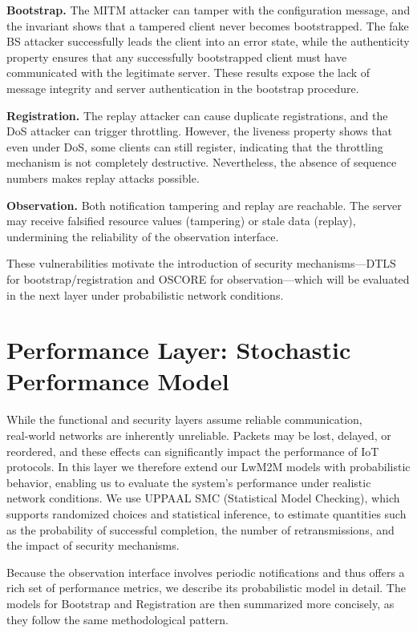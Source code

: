 \documentclass[a4paper,fleqn]{cas-sc}
\begin{document}
\textbf{Bootstrap.} The MITM attacker can tamper with the configuration message, and the invariant shows that a tampered client never becomes bootstrapped. The fake BS attacker successfully leads the client into an error state, while the authenticity property ensures that any successfully bootstrapped client must have communicated with the legitimate server. These results expose the lack of message integrity and server authentication in the bootstrap procedure.

\textbf{Registration.} The replay attacker can cause duplicate registrations, and the DoS attacker can trigger throttling. However, the liveness property shows that even under DoS, some clients can still register, indicating that the throttling mechanism is not completely destructive. Nevertheless, the absence of sequence numbers makes replay attacks possible.

\textbf{Observation.} Both notification tampering and replay are reachable. The server may receive falsified resource values (tampering) or stale data (replay), undermining the reliability of the observation interface.

These vulnerabilities motivate the introduction of security mechanisms—DTLS for bootstrap/registration and OSCORE for observation—which will be evaluated in the next layer under probabilistic network conditions.

\section{Performance Layer: Stochastic Performance Model}
While the functional and security layers assume reliable communication, real‑world networks are inherently unreliable. Packets may be lost, delayed, or reordered, and these effects can significantly impact the performance of IoT protocols. In this layer we therefore extend our LwM2M models with probabilistic behavior, enabling us to evaluate the system’s performance under realistic network conditions. We use UPPAAL SMC (Statistical Model Checking), which supports randomized choices and statistical inference, to estimate quantities such as the probability of successful completion, the number of retransmissions, and the impact of security mechanisms.

Because the observation interface involves periodic notifications and thus offers a rich set of performance metrics, we describe its probabilistic model in detail. The models for Bootstrap and Registration are then summarized more concisely, as they follow the same methodological pattern.
\end{document}
